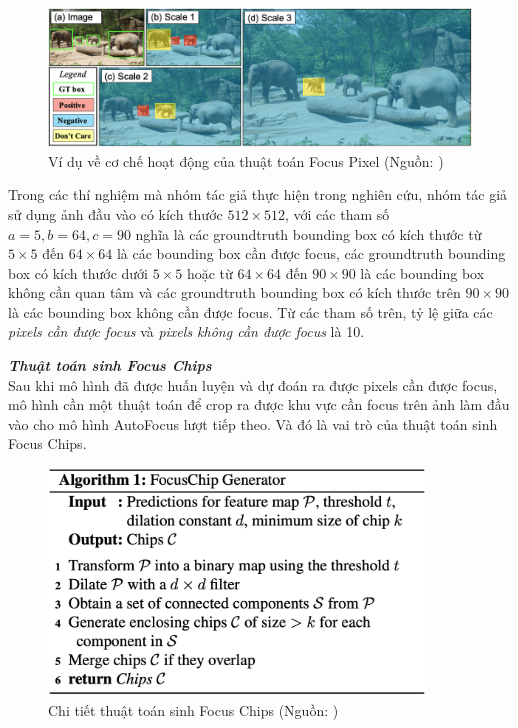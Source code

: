 {    \begin{figure}[H]
        \centering
        \includegraphics[width=15cm] {images/autofocus_focus_pixel}
        \caption{Ví dụ về cơ chế hoạt động của thuật toán Focus Pixel  (Nguồn: \cite{najibi2019autofocus})}
        \label{fig:autofocus_focus_pixel}
    \end{figure}

    \noindent
    Trong các thí nghiệm mà nhóm tác giả thực hiện trong nghiên cứu, nhóm tác giả sử dụng ảnh đầu vào có kích thước $512 \times 512$, với các tham số $a = 5, b = 64, c = 90$ nghĩa là các groundtruth  bounding box  có kích thước từ $5 \times 5$ đến $64 \times 64$ là các bounding box  cần được focus, các groundtruth  bounding box  có kích thước dưới $5 \times 5$ hoặc từ $64 \times 64$ đến $90 \times 90$ là các bounding box  không cần quan tâm và các groundtruth  bounding box  có kích thước trên $90 \times 90$ là các bounding box  không cần được focus.
    Từ các tham số trên, tỷ lệ giữa các \textit{pixels  cần được focus} và \textit{pixels  không cần được focus} là 10.

    \noindent
    \textbf{\textit{Thuật toán sinh Focus Chips}} \\
    Sau khi mô hình đã được huấn luyện và dự đoán ra được pixels  cần được focus, mô hình cần một thuật toán để crop ra được khu vực cần focus trên ảnh làm đầu vào cho mô hình AutoFocus lượt tiếp theo.
    Và đó là vai trò của thuật toán sinh Focus Chips.

    \begin{figure}[H]
        \centering
        \includegraphics[width=10cm] {images/autofocus_focus_chip_gen}
        \caption{Chi tiết thuật toán sinh Focus Chips (Nguồn: \cite{najibi2019autofocus})}
        \label{fig:autofocus_focus_chip_gen}
    \end{figure}

}
